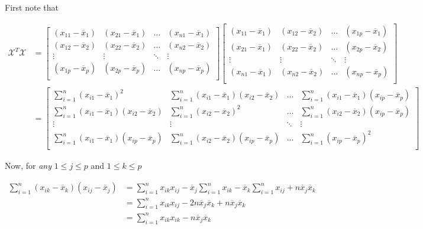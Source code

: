 \documentclass[12pt]{article}  %
\begin{document}
First note that

\begin{align*}\mathcal{X}^{T}\mathcal{X} &= 
\begin{bmatrix}
(x_{11} - \overline{x}_1) & (x_{21}-\overline{x}_1) & \dots & (x_{n1}-\overline{x}_1)\\
(x_{12} - \overline{x}_2) & (x_{22}-\overline{x}_2) & \dots & (x_{n2}-\overline{x}_2)\\
\vdots & \vdots & \ddots & \vdots \\
(x_{1p} - \overline{x}_p) & (x_{2p}-\overline{x}_p) & \dots & (x_{np}-\overline{x}_p)\\
\end{bmatrix}
\begin{bmatrix}
(x_{11} - \overline{x}_1) & (x_{12}-\overline{x}_2) & \dots & (x_{1p}-\overline{x}_1)\\
(x_{21} - \overline{x}_1) & (x_{22}-\overline{x}_2) & \dots & (x_{2p}-\overline{x}_2)\\
\vdots & \vdots & \ddots & \vdots \\
(x_{n1} - \overline{x}_1) & (x_{n2}-\overline{x}_2) & \dots & (x_{np}-\overline{x}_p)\\
\end{bmatrix} \\
&=\begin{bmatrix}
\sum_{i=1}^{n}(x_{i1}-\overline{x}_1)^2 & \sum_{i=1}^{n}(x_{i1}-\overline{x}_{1})(x_{i2}-\overline{x}_2) & \dots & \sum_{i=1}^{n}(x_{i1}-\overline{x}_1)(x_{ip}-\overline{x}_{p})\\
\sum_{i=1}^{n}(x_{i1}-\overline{x}_1)(x_{i2}-\overline{x}_2) & \sum_{i=1}^{n}(x_{i2}-\overline{x}_2)^2 & \dots & \sum_{i=1}^{n}(x_{i2}-\overline{x}_2)(x_{ip}-\overline{x}_{p})\\
\vdots & \vdots & \ddots & \vdots\\
\sum_{i=1}^{n}(x_{i1}-\overline{x}_1)(x_{ip}-\overline{x}_p) & \sum_{i=1}^{n}(x_{i2}-\overline{x}_2)(x_{ip}-\overline{x}_p) & \dots & \sum_{i=1}^{n}(x_{ip}-\overline{x}_p)^2\\
\end{bmatrix} 
\end{align*}

Now, for \textit{any} $1\leq j\leq p$ and $1\leq k\leq p$

\begin{align*}
\sum_{i=1}^{n}(x_{ik}-\overline{x}_k)(x_{ij}-\overline{x}_{j}) &= \sum_{i=1}^{n}x_{ik}x_{ij} - \overline{x}_j\sum_{i=1}^{n}x_{ik} - \overline{x}_k\sum_{i=1}^{n}x_{ij} + n\overline{x}_j\overline{x}_k\\
&=\sum_{i=1}^{n}x_{ik}x_{ij} - 2n\overline{x}_j\overline{x}_k+n\overline{x}_j\overline{x}_k\\
&= \sum_{i=1}^{n}x_{ik}x_{ik} - n\overline{x}_{j}\overline{x}_k
\end{align*}
\end{document}
